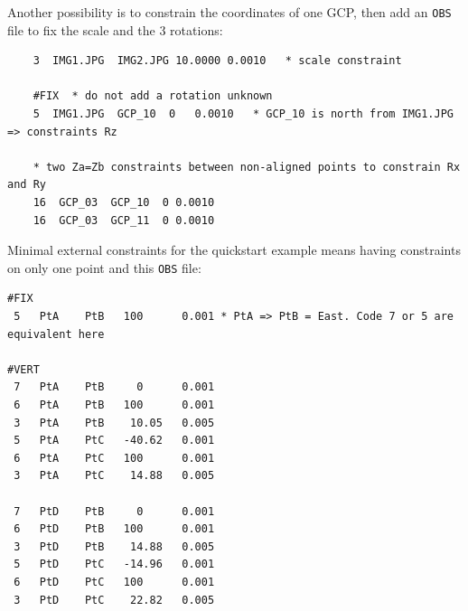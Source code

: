 Another possibility is to constrain the coordinates of one GCP, then add an \texttt{OBS} file to fix the scale and the 3 rotations:
\begin{verbatim}
    3  IMG1.JPG  IMG2.JPG 10.0000 0.0010   * scale constraint

    #FIX  * do not add a rotation unknown
    5  IMG1.JPG  GCP_10  0   0.0010   * GCP_10 is north from IMG1.JPG => constraints Rz

    * two Za=Zb constraints between non-aligned points to constrain Rx and Ry
    16  GCP_03  GCP_10  0 0.0010
    16  GCP_03  GCP_11  0 0.0010
\end{verbatim}

Minimal external constraints for the quickstart example means having constraints on only one point and this \texttt{OBS} file:

\begin{verbatim}
#FIX
 5   PtA    PtB   100      0.001 * PtA => PtB = East. Code 7 or 5 are equivalent here
 
#VERT
 7   PtA    PtB     0      0.001
 6   PtA    PtB   100      0.001
 3   PtA    PtB    10.05   0.005
 5   PtA    PtC   -40.62   0.001
 6   PtA    PtC   100      0.001
 3   PtA    PtC    14.88   0.005

 7   PtD    PtB     0      0.001
 6   PtD    PtB   100      0.001
 3   PtD    PtB    14.88   0.005
 5   PtD    PtC   -14.96   0.001
 6   PtD    PtC   100      0.001
 3   PtD    PtC    22.82   0.005
\end{verbatim}



